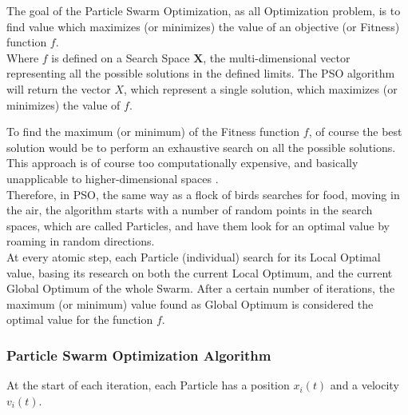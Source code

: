 The goal of the Particle Swarm Optimization, as all Optimization problem, is to find value which maximizes (or minimizes) the value of an objective (or Fitness) function $f$.
\\[0.3cm]Where $f$ is defined on a Search Space {$\textbf{X}$}, the multi-dimensional vector representing all the possible solutions in the defined limits.
The PSO algorithm will return the vector $X$, which represent a single solution, which maximizes (or minimizes) the value of $f$.

To find the maximum (or minimum) of the Fitness function $f$, of course the best solution would be to perform an exhaustive search on all the possible solutions. This approach is of course too computationally expensive, and basically unapplicable to higher-dimensional spaces \cite{Tesi-3.1}.
\\[0.3cm]Therefore, in PSO, the same way as a flock of birds searches for food, moving in the air, the algorithm starts with a number of random points in the search spaces, which are called Particles, and have them look for an optimal value by roaming in random directions.
\\[0.3cm]At every atomic step, each Particle (individual) search for its Local Optimal value, basing its research on both the current Local Optimum, and the current Global Optimum of the whole Swarm.
After a certain number of iterations, the maximum (or minimum) value found as Global Optimum is considered the optimal value for the function $f$.

\subsubsection{Particle Swarm Optimization Algorithm}

At the start of each iteration, each Particle has a position $x_i(t)$ and a velocity $v_i(t)$.

